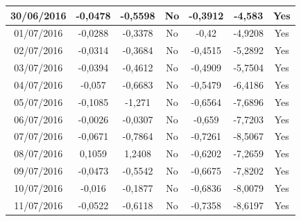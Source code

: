 \documentclass[11pt]{report}
\begin{document}
\begin{table}[!h]
\begin{tabular}{c|c|c|c|c|c|c|}
\multicolumn{1}{|c|}{30/06/2016}          & -0,0478         & -0,5598          & No               & -0,3912          & -4,583           & Yes              \\ \hline
\multicolumn{1}{|c|}{01/07/2016}          & -0,0288         & -0,3378          & No               & -0,42            & -4,9208          & Yes              \\ \hline
\multicolumn{1}{|c|}{02/07/2016}          & -0,0314         & -0,3684          & No               & -0,4515          & -5,2892          & Yes              \\ \hline
\multicolumn{1}{|c|}{03/07/2016}          & -0,0394         & -0,4612          & No               & -0,4909          & -5,7504          & Yes              \\ \hline
\multicolumn{1}{|c|}{04/07/2016}          & -0,057          & -0,6683          & No               & -0,5479          & -6,4186          & Yes              \\ \hline
\multicolumn{1}{|c|}{05/07/2016}          & -0,1085         & -1,271           & No               & -0,6564          & -7,6896          & Yes              \\ \hline
\multicolumn{1}{|c|}{06/07/2016}          & -0,0026         & -0,0307          & No               & -0,659           & -7,7203          & Yes              \\ \hline
\multicolumn{1}{|c|}{07/07/2016}          & -0,0671         & -0,7864          & No               & -0,7261          & -8,5067          & Yes              \\ \hline
\multicolumn{1}{|c|}{08/07/2016}          & 0,1059          & 1,2408           & No               & -0,6202          & -7,2659          & Yes              \\ \hline
\multicolumn{1}{|c|}{09/07/2016}          & -0,0473         & -0,5542          & No               & -0,6675          & -7,8202          & Yes              \\ \hline
\multicolumn{1}{|c|}{10/07/2016}          & -0,016          & -0,1877          & No               & -0,6836          & -8,0079          & Yes              \\ \hline
\multicolumn{1}{|c|}{11/07/2016}          & -0,0522         & -0,6118          & No               & -0,7358          & -8,6197          & Yes              \\ \hline
\end{tabular}
\end{table}
\clearpage
\end{document}
